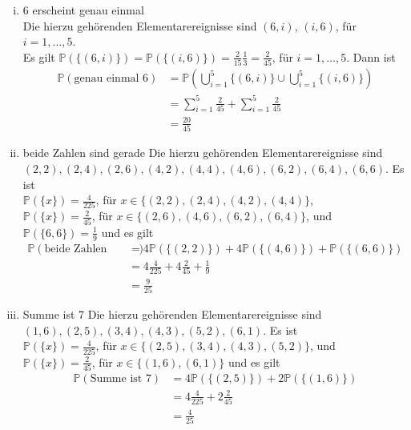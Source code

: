 \documentclass[11pt,a4paper,ngerman]{article}
\newcommand{\set}[1]{ \{ #1 \}}
\newcommand{\Prob}{\mathbb{P}}
\begin{document}
\begin{enumerate}[i)]
\item 6 erscheint genau einmal \\
Die hierzu gehörenden Elementarereignisse sind $(6,i)$, $(i, 6)$, für $i = 1,\ldots,5$.\\
Es gilt $\Prob(\set{(6,i)}) = \Prob(\set{(i,6)}) = \frac{2}{15} \frac{1}{3} = \frac{2}{45}$, für $ i = 1,\ldots,5$.
Dann ist 
\begin{equation*}\begin{split}
\Prob(\text{genau einmal 6}) &= \Prob \left( \bigcup_{i=1}^5 \set{(6,i)} \cup \bigcup_{i=1}^5 \set{(i,6)}\right)\\
&= \sum_{i=1}^5 \frac{2}{45} + \sum_{i=1}^5 \frac{2}{45} \\
&= \frac{20}{45}
\end{split}\end{equation*}
\item beide Zahlen sind gerade
Die hierzu gehörenden Elementarereignisse sind\\
$(2,2), (2,4), (2, 6), (4,2), (4,4), (4,6), (6,2), (6,4), (6,6)$. 
Es ist \\ $\Prob(\set{x}) = \frac{4}{225}$, für $x \in \set{(2,2), (2,4), (4,2), (4,4)}$, \\
$\Prob(\set{x}) = \frac{2}{45}$, für $x \in \set{(2,6), (4,6), (6,2), (6,4)}$, und \\
$\Prob(\set{6,6}) = \frac{1}{9}$ und es gilt
\begin{equation*}\begin{split}
\Prob(\text{beide Zahlen gerade}) &= 4 \Prob(\set{(2,2)}) + 4 \Prob(\set{(4,6)}) + \Prob( \set{(6,6)}) \\
&= 4 \frac{4}{225} + 4\frac{2}{45} + \frac{1}{9} \\
&= \frac{9}{25}
\end{split}\end{equation*}

\item Summe ist 7
Die hierzu gehörenden Elementarereignisse sind\\
$(1,6), (2, 5), (3, 4), (4, 3), (5, 2), (6, 1)$.
Es ist \\ $\Prob(\set{x}) = \frac{4}{225}$, für $x \in \set{(2,5), (3,4), (4,3), (5,2)}$, und \\
$\Prob(\set{x}) = \frac{2}{45}$, für $x \in \set{(1,6), (6,1)}$ und es gilt
\begin{equation*}\begin{split}
\Prob(\text{Summe ist 7}) &= 4 \Prob(\set{(2,5)}) + 2 \Prob(\set{(1,6)}) \\
&= 4 \frac{4}{225} + 2\frac{2}{45}\\
&= \frac{4}{25}
\end{split}\end{equation*}

\end{enumerate}
\end{document}
